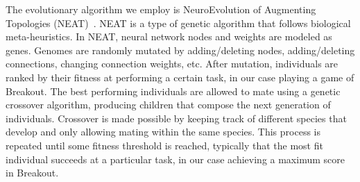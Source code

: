 \documentclass[letterpaper, twocolumn]{article}
\begin{document}
The evolutionary algorithm we employ is NeuroEvolution of Augmenting Topologies
(NEAT)~\cite{stanley2002evolving, stanley2002efficient}.
NEAT is a type of genetic algorithm that follows biological meta-heuristics.
In NEAT, neural network nodes and weights are modeled as genes.
Genomes are randomly mutated by adding/deleting nodes, adding/deleting connections, changing connection weights, etc.
After mutation, individuals are ranked by their fitness at performing a certain task, in our case playing a game of Breakout.
The best performing individuals are allowed to mate using a genetic crossover algorithm,
producing children that compose the next generation of individuals.
Crossover is made possible by keeping track of different species that develop and
only allowing mating within the same species.
This process is repeated until some fitness threshold is reached, typically
that the most fit individual succeeds at a particular task, in our case achieving a maximum score in Breakout.
\end{document}
